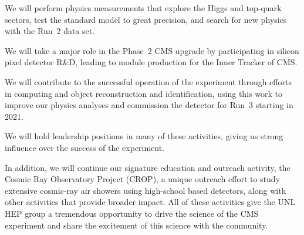 \begin{packed_enum}
\item We will perform physics measurements that explore the Higgs and top-quark sectors, test the standard model to great precision, and search for new physics with the Run~2 data set.
\item We will take a major role in the Phase~2 CMS upgrade by participating in silicon pixel detector R\&D, leading to module production for the Inner Tracker of CMS.
\item We will contribute to the successful operation of the experiment through efforts in computing and object reconstruction and identification, using this work to improve our physics analyses and commission the detector for Run~3 starting in 2021.
\item We will hold leadership positions in many of these activities, giving us strong influence over the success of the experiment.
\end{packed_enum}

In addition, we will continue our signature education and outreach activity, the Cosmic Ray Observatory Project (CROP), a unique outreach effort to study extensive cosmic-ray air showers using high-school based detectors, along with other activities that provide broader impact.  All of these activities give the UNL HEP group a tremendous opportunity to drive the science of the CMS experiment and share the excitement of this science with the community.

